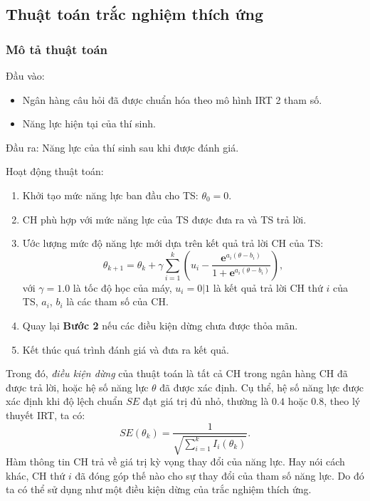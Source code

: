 \subsection{Thuật toán trắc nghiệm thích ứng}
\subsubsection{Mô tả thuật toán}

\noindent Đầu vào:\par
\begin{itemize}
	\item Ngân hàng câu hỏi đã được chuẩn hóa theo mô hình IRT 2 tham số.
	\item Năng lực hiện tại của thí sinh.
\end{itemize}\par
\noindent Đầu ra: Năng lực của thí sinh sau khi được đánh giá.\par
\noindent Hoạt động thuật toán:\par
\begin{enumerate}[label=\textbf{Bước \arabic*.},align=left,left=0cm..0cm,itemindent=*]
	\item Khởi tạo mức năng lực ban đầu cho TS: $\theta_0=0$.
	\item CH phù hợp với mức năng lực của TS được đưa ra và TS trả lời.
	\item Ước lượng mức độ năng lực mới dựa trên kết quả trả lời CH của TS:
	$$\theta_{k+1}=\theta_k+\gamma\sum_{i=1}^{k}\left(u_i-\frac{\mathbf{e}^{a_i(\theta-b_i)}}{1+\mathbf{e}^{a_i(\theta-b_i)}}\right),$$
	với $\gamma=1.0$ là tốc độ học của máy, $u_i=0|1$ là kết quả trả lời CH thứ $i$ của TS, $a_i$, $b_i$ là các tham số của CH.
	\item Quay lại \textbf{Bước 2} nếu các điều kiện dừng chưa được thỏa mãn.
	\item Kết thúc quá trình đánh giá và đưa ra kết quả.
\end{enumerate}\par
Trong đó, \textit{điều kiện dừng} của thuật toán là tất cả CH trong ngân hàng CH đã được trả lời, hoặc hệ số năng lực $\theta$ đã được xác định. Cụ thể, hệ số năng lực được xác định khi độ lệch chuẩn $SE$ đạt giá trị đủ nhỏ, thường là $0.4$ hoặc $0.8$, theo lý thuyết IRT, ta có:
$$SE(\theta_k)=\frac{1}{\sqrt{\sum_{i=1}^{k}I_i(\theta_k)}}.$$
Hàm thông tin CH trả về giá trị kỳ vọng thay đổi của năng lực. Hay nói cách khác, CH thứ $i$ đã đóng góp thế nào cho sự thay đổi của tham số năng lực. Do đó ta có thể sử dụng như một điều kiện dừng của trắc nghiệm thích ứng.\par

